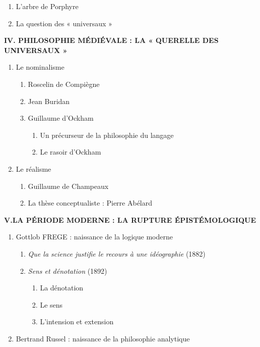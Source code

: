 \begin{keybox}
\begin{enumerate}[label=\arabic*.]
\begin{enumerate}[label=\textcircled{\scriptsize\arabic*}]
\item L’arbre de Porphyre
\item La question des « universaux »
\end{enumerate}
\end{enumerate}
\textbf{IV. PHILOSOPHIE MÉDIÉVALE : LA « QUERELLE DES UNIVERSAUX »}
\begin{enumerate}[label=\arabic*.]
\item Le nominalisme
\begin{enumerate}[label=\textcircled{\scriptsize\arabic*}]
\item Roscelin de Compiègne
\item Jean Buridan
\item Guillaume d’Ockham
\begin{enumerate}[label=\arabic*.]
\item Un précurseur de la philosophie du langage
\item Le rasoir d’Ockham
\end{enumerate}
\end{enumerate}
\item Le réalisme
\begin{enumerate}[label=\textcircled{\scriptsize\arabic*}]
\item Guillaume de Champeaux
\item La thèse conceptualiste : Pierre Abélard
\end{enumerate}
\end{enumerate}
\textbf{V.\quad LA PÉRIODE MODERNE : LA RUPTURE ÉPISTÉMOLOGIQUE}
\begin{enumerate}[label=\arabic*.]
\item Gottlob FREGE : naissance de la logique moderne
\begin{enumerate}[label=\textcircled{\scriptsize\arabic*}]
\item \textit{Que la science justifie le recours à une idéographie} (1882)
\item \textit{Sens et dénotation} (1892)
\begin{enumerate}[label=\arabic*.]
\item La dénotation
\item Le sens
\item L’intension et extension
\end{enumerate}
\end{enumerate}
\item Bertrand Russel : naissance de la philosophie analytique
\begin{enumerate}[label=\textcircled{\scriptsize\arabic*}]

\end{enumerate}
\end{enumerate}
\end{keybox}
